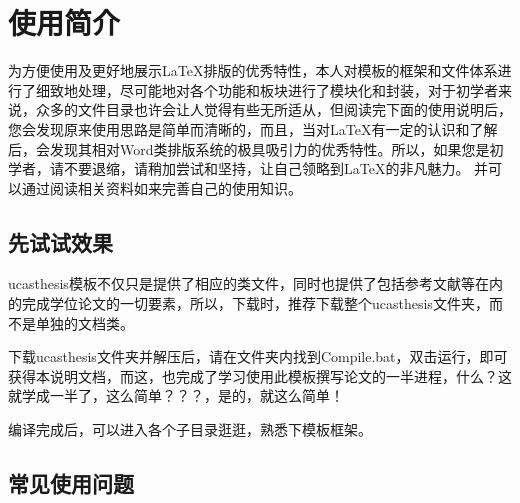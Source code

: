 
\chapter{使用简介}
\label{chap:guide}

为方便使用及更好地展示\LaTeX{}排版的优秀特性，本人对模板的框架和文件体系进行了细致地处理，尽可能地对各个功能和板块进行了模块化和封装，对于初学者来说，众多的文件目录也许会让人觉得有些无所适从，但阅读完下面的使用说明后，您会发现原来使用思路是简单而清晰的，而且，当对\LaTeX{}有一定的认识和了解后，会发现其相对Word类排版系统的极具吸引力的优秀特性。所以，如果您是初学者，请不要退缩，请稍加尝试和坚持，让自己领略到\LaTeX{}的非凡魅力。 并可以通过阅读相关资料如\citep{wikibook2014latex}来完善自己的使用知识。

\section{先试试效果}

ucasthesis模板不仅只是提供了相应的类文件，同时也提供了包括参考文献等在内的完成学位论文的一切要素，所以，下载时，推荐下载整个ucasthesis文件夹，而不是单独的文档类。

下载ucasthesis文件夹并解压后，请在文件夹内找到Compile.bat，双击运行，即可获得本说明文档，而这，也完成了学习使用此模板撰写论文的一半进程，什么？这就学成一半了，这么简单？？？，是的，就这么简单！

编译完成后，可以进入各个子目录逛逛，熟悉下模板框架。

\section{常见使用问题}

